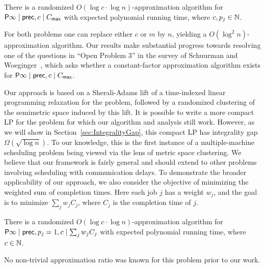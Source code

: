 \begin{corollary} \label{cor:colmain_sched1}
There is a randomized $O(\log c \cdot \log n)$-approximation algorithm for $\mathsf{P} \infty \mid \mathsf{prec}, c \mid C_{\mathsf{max}}$ with expected polynomial running time, where $c, p_j \in \mathbb{N}$.
\end{corollary}

For both problems one can replace either $c$ or $m$ by $n$, yielding a $O(\log^2 n)$-approximation algorithm.
Our results make substantial progress towards resolving  one of the questions in ``Open Problem 3'' in the survey of Schuurman and Woeginger~\cite{SW99a}, which asks whether a constant-factor approximation algorithm exists for $\mathsf{P} \infty \mid \mathsf{prec}, c \mid C_{\mathsf{max}}$.

Our approach is based on a Sherali-Adams lift of a time-indexed linear programming relaxation for the problem, followed by a randomized clustering of the semimetric space induced by this lift.
It is possible to write a more compact LP for the problem for which our algorithm and analysis still work. 
However, as we will show in Section~\ref{sec:IntegralityGap}, this compact LP has integrality gap $ \Omega(\sqrt{\log n})$.
To our knowledge, this is the first instance of a multiple-machine scheduling problem being viewed via the lens of metric space clustering.
We believe that our framework is fairly general and should extend to other problems involving scheduling with communication delays.
To demonstrate the broader applicability of our approach, we also consider the objective of minimizing the weighted sum of completion times. Here each job $j$ has a weight $w_j$, and the goal is to minimize $\sum_{j} w_j C_j$, where $C_j$ is the completion time of $j$.  

\begin{theorem} \label{thm:maincomp_sched1}
There is a randomized $O(\log c \cdot \log n)$-approximation algorithm for  $\mathsf{P} \infty \mid \mathsf{prec}, p_j = 1, c \mid \sum_{j} w_j C_j$ with expected polynomial running time, where $c \in \mathbb{N}$.
\end{theorem}

No non-trivial approximation ratio was known for this problem prior to our work. 




